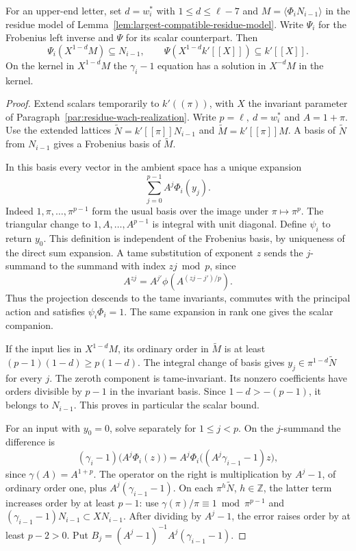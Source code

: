 \begin{lemma}
\label{lem:residue-frobenius-left-inverse}
For an upper-end letter, set \(d=w_i^*\) with \(1\le d\le\ell-7\)
and \(M=\langle\Phi_i N_{i-1}\rangle\) in the residue model of
Lemma~\ref{lem:largest-compatible-residue-model}. Write \(\Psi_i\) for the Frobenius left inverse and \(\Psi\) for its scalar counterpart. Then
\[
 \Psi_i(X^{1-d}M)\subseteq N_{i-1},\qquad\Psi(X^{1-d}k'[[X]])\subseteq k'[[X]].
\]
On the kernel in \(X^{1-d}M\) the \(\gamma_i-1\) equation
has a solution in \(X^{-d}M\) in the kernel.
\end{lemma}

\begin{proof}
Extend scalars temporarily to
\(k'((\pi))\), with \(X\) the invariant parameter of
Paragraph~\ref{par:residue-wach-realization}.
Write \(p=\ell,\ d=w_i^*\) and \(A=1+\pi\).
Use the extended lattices \(\widetilde N=k'[[\pi]]N_{i-1}\)
and \(\widetilde M=k'[[\pi]]M\). A basis of \(\widetilde N\)
from \(N_{i-1}\) gives a Frobenius basis of \(\widetilde M\).

In this basis every vector in the ambient space has a unique
expansion
\[
             \sum_{j=0}^{p-1} A^j\Phi_i(y_j).
\]
Indeed \(1,\pi,\ldots,\pi^{p-1}\) form the usual basis over
the image under \(\pi\mapsto\pi^p\). The triangular change
to \(1,A,\ldots,A^{p-1}\) is integral with unit diagonal.
Define \(\psi_i\) to return \(y_0\). This definition is
independent of the Frobenius basis, by uniqueness of the
direct sum expansion. A tame substitution of exponent \(z\)
sends the \(j\)-summand to the summand with index \(zj\bmod p\),
since
\[
 A^{zj}=A^{j'}\phi(A^{(zj-j')/p}).
\]
Thus the
projection descends to the tame invariants, commutes with
the principal action and satisfies \(\psi_i\Phi_i=1\).
The same expansion in rank one gives the scalar companion.

If the input lies in \(X^{1-d}M\), its ordinary order in
\(\widetilde M\) is at least \((p-1)(1-d)\ge p(1-d)\).
The integral change of basis gives
\(y_j\in\pi^{1-d}\widetilde N\) for every \(j\).
The zeroth component is tame-invariant. Its nonzero
coefficients have orders divisible by \(p-1\) in the
invariant basis. Since \(1-d>-(p-1)\), it belongs to
\(N_{i-1}\). This proves in particular the scalar bound.

For an input with \(y_0=0\), solve separately for \(1\le j<p\).
On the \(j\)-summand the difference is
\[
   (\gamma_i-1)\bigl(A^j\Phi_i(z)\bigr)
      = A^j\Phi_i\bigl((A^j\gamma_{i-1}-1)z\bigr),
\]
since \(\gamma(A)=A^{1+p}\). The operator on the right is
multiplication by \(A^j-1\), of ordinary order one, plus
\(A^j(\gamma_{i-1}-1)\). On each
\(\pi^h\widetilde N\), \(h\in\mathbb Z\), the latter term
increases order by at least \(p-1\): use
\(\gamma(\pi)/\pi\equiv1\bmod\pi^{p-1}\) and
\((\gamma_{i-1}-1)N_{i-1}\subset XN_{i-1}\).
After dividing by \(A^j-1\), the error raises order by at
least \(p-2>0\). Put \(B_j=(A^j-1)^{-1}A^j(\gamma_{i-1}-1)\).


\end{proof}
